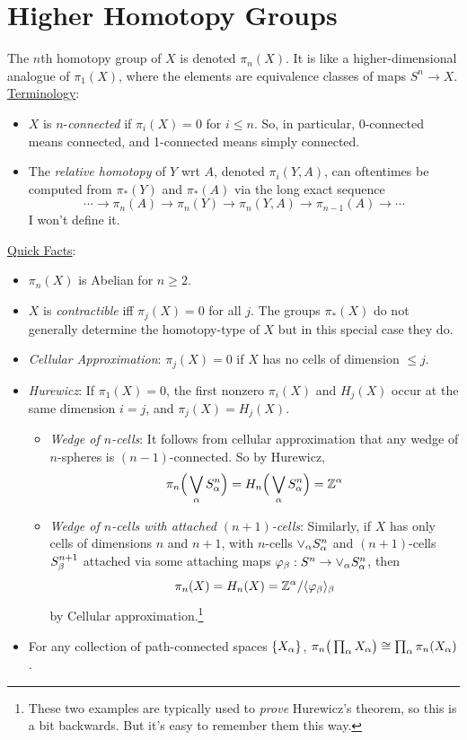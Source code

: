 \documentclass{amsart}
\begin{document}
	\newpage
	\section{Higher Homotopy Groups}
	
	The $n$th homotopy group of $X$ is denoted $\pi_n(X)$. It is like a higher-dimensional analogue of $\pi_1(X)$, where the elements are equivalence classes of maps $S^n\to X$.\\
	
	\underline{Terminology}:
	\begin{itemize}
		\item $X$ is $n$-\textit{connected} if $\pi_i(X)=0$ for $i\leq n$. So, in particular, $0$-connected means connected, and 1-connected means simply connected.
		\item The \textit{relative homotopy} of $Y$ wrt $A$, denoted $\pi_i(Y,A)$, can oftentimes be computed from $\pi_*(Y)$ and $\pi_*(A)$ via the long exact sequence
		$$
		\cdots \to \pi_n(A) \to \pi_n(Y) \to \pi_n(Y,A)\to \pi_{n-1}(A) \to \cdots 
		$$
		I won't define it.\\
	\end{itemize}
	
	\underline{Quick Facts}:
	\begin{itemize}
		\item $\pi_n(X)$ is Abelian for $n \geq 2$.
		\item $X$ is \textit{contractible} iff $\pi_j(X)=0$ for all $j$. The groups $\pi_*(X)$ do not generally determine the homotopy-type of $X$ but in this special case they do.
		\item \textit{Cellular Approximation}: $\pi_j(X)=0$ if $X$ has no cells of dimension $\leq j$.
		\item \textit{Hurewicz}: If $\pi_1(X)=0$, the first nonzero $\pi_i(X)$ and $H_j(X)$ occur at the same dimension $i=j$, and $\pi_j(X)=H_j(X)$.
		\begin{itemize}
			\item \textit{\color{blue}Wedge of $n$-cells}: It follows from cellular approximation that any wedge of $n$-spheres is $(n-1)$-connected. So by Hurewicz, $$\pi_n\Big(\bigvee_{\alpha}S^n_{\alpha}\Big) = H_n\Big(\bigvee_{\alpha}S^n_{\alpha}\Big) = \mathbb{Z}^{\alpha}$$
			\item \textit{\color{blue}Wedge of $n$-cells with attached $(n+1)$-cells}: Similarly, if $X$ has only cells of dimensions $n$ and $n+1$, with $n$-cells $\vee_{\alpha}S^n_{\alpha}$ and $(n+1)$-cells $S^{n+1}_{\beta}$ attached via some attaching maps $\varphi_{\beta}:S^n\to \vee_{\alpha}S^n_{\alpha}$, then 
			$$
			\pi_n(X) = H_n(X) = \mathbb{Z}^{\alpha} / \langle\varphi_{\beta}\rangle_{\beta}
			$$
			by Cellular approximation.\footnote{These two examples are typically used to \textit{prove} Hurewicz's theorem, so this is a bit backwards. But it's easy to remember them this way.}
		\end{itemize}
		\item For any collection of path-connected spaces $\{X_{\alpha}\}$, $\pi_n\big(\prod_{\alpha} X_{\alpha}\big) \cong \prod_{\alpha}\pi_n(X_{\alpha})$.\\
	\end{itemize}
	
\end{document}
